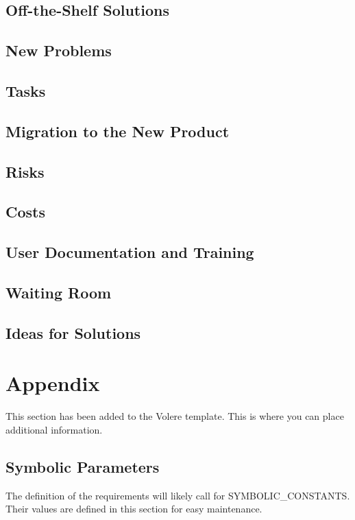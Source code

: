 \documentclass[12pt, titlepage]{article}
\begin{document}
\subsection{Off-the-Shelf Solutions}

\subsection{New Problems}

\subsection{Tasks}

\subsection{Migration to the New Product}

\subsection{Risks}

\subsection{Costs}

\subsection{User Documentation and Training}

\subsection{Waiting Room}

\subsection{Ideas for Solutions}





\newpage

\section{Appendix}

This section has been added to the Volere template.  This is where you can place
additional information.

\subsection{Symbolic Parameters}

The definition of the requirements will likely call for SYMBOLIC\_CONSTANTS.
Their values are defined in this section for easy maintenance.
\end{document}
